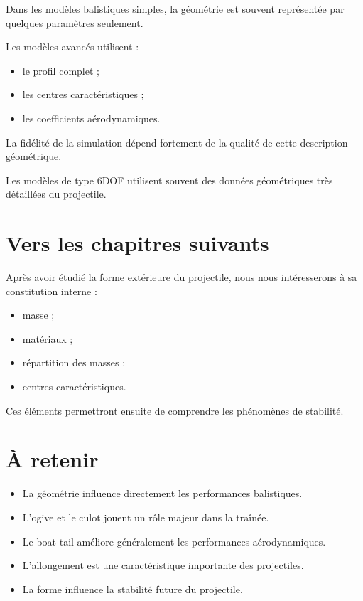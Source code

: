Dans les modèles balistiques simples, la géométrie est souvent représentée
par quelques paramètres seulement.

Les modèles avancés utilisent :

\begin{itemize}
    \item le profil complet ;
    \item les centres caractéristiques ;
    \item les coefficients aérodynamiques.
\end{itemize}

La fidélité de la simulation dépend fortement de la qualité de cette
description géométrique.

\begin{simulation}

Les modèles de type 6DOF utilisent souvent des données géométriques très
détaillées du projectile.

\end{simulation}

\section{Vers les chapitres suivants}

Après avoir étudié la forme extérieure du projectile, nous nous
intéresserons à sa constitution interne :

\begin{itemize}
    \item masse ;
    \item matériaux ;
    \item répartition des masses ;
    \item centres caractéristiques.
\end{itemize}

Ces éléments permettront ensuite de comprendre les phénomènes de stabilité.

\section{À retenir}

\begin{aretenir}

\begin{itemize}
    \item La géométrie influence directement les performances balistiques.
    \item L'ogive et le culot jouent un rôle majeur dans la traînée.
    \item Le boat-tail améliore généralement les performances aérodynamiques.
    \item L'allongement est une caractéristique importante des projectiles.
    \item La forme influence la stabilité future du projectile.
\end{itemize}

\end{aretenir}
